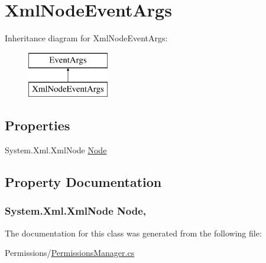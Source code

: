\hypertarget{classOTA_1_1Permissions_1_1XmlNodeEventArgs}{}\section{Xml\+Node\+Event\+Args}
\label{classOTA_1_1Permissions_1_1XmlNodeEventArgs}
Inheritance diagram for Xml\+Node\+Event\+Args\+:\begin{figure}[H]
\begin{center}
\leavevmode
\includegraphics[height=2.000000cm]{classOTA_1_1Permissions_1_1XmlNodeEventArgs}
\end{center}
\end{figure}
\subsection*{Properties}
\begin{DoxyCompactItemize}
\item 
System.\+Xml.\+Xml\+Node \hyperlink{classOTA_1_1Permissions_1_1XmlNodeEventArgs_a9b10b0aa02eba9cbd8087e57663ce9f5}{Node}
\end{DoxyCompactItemize}


\subsection{Property Documentation}
\hypertarget{classOTA_1_1Permissions_1_1XmlNodeEventArgs_a9b10b0aa02eba9cbd8087e57663ce9f5}{}
\subsubsection[{Node}]{\setlength{\rightskip}{0pt plus 5cm}System.\+Xml.\+Xml\+Node Node\hspace{0.3cm}{\ttfamily [get]}, {\ttfamily [set]}}\label{classOTA_1_1Permissions_1_1XmlNodeEventArgs_a9b10b0aa02eba9cbd8087e57663ce9f5}


The documentation for this class was generated from the following file\+:\begin{DoxyCompactItemize}
\item 
Permissions/\hyperlink{PermissionsManager_8cs}{Permissions\+Manager.\+cs}\end{DoxyCompactItemize}
